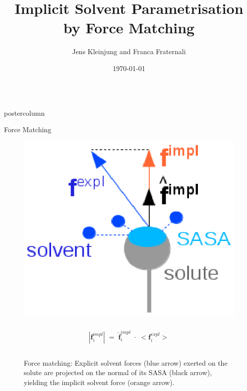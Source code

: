 \documentclass{beamer}
\title{\huge Implicit Solvent Parametrisation by Force Matching}
\author{Jens Kleinjung and Franca Fraternali}
\institute[]{The Francis Crick Institute, King's College London}
\date{\today}
\newlength{\columnheight}
\begin{document}
\begin{frame}
\begin{columns}
\begin{column}{.43\textwidth}
\begin{beamercolorbox}[center]{postercolumn}
\begin{minipage}{.98\textwidth}  %
\parbox[t][\columnheight]{\textwidth}{ %
\begin{myblock}{Force Matching}
\begin{figure}
\begin{minipage}{0.43\textwidth}
	\centering\includegraphics[width=1.0\textwidth]{force_matching1}
	\caption{Force matching: Explicit solvent forces (blue arrow) exerted on the solute are projected on the normal of its SASA (black arrow), yielding the implicit solvent force (orange arrow).}
\label{fig:projection}
\end{minipage}
\begin{minipage}{0.43\textwidth}
\begin{gather}
	\label{eq:sigma}
	\nonumber \quad \\
	\nonumber \left| \mathbf{f}_i^{impl} \right| \; = \; \hat{\mathbf{f}}_i^{impl} \; \cdot \; <\mathbf{f}_i^{expl}> \\
	\nonumber \quad \\

\end{gather}
\end{minipage}
\end{figure}
\end{myblock}}
\end{minipage}
\end{beamercolorbox}
\end{column}
\end{columns}
\end{frame}
\end{document}
